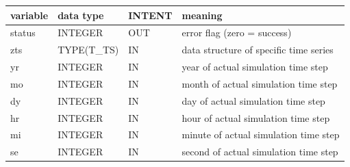 \documentclass[11pt,twoside]{report}
\begin{document}
\begin{tabular}{lllp{6cm}}\hline
 variable & data type &  INTENT & meaning\\\hline
 status &   INTEGER   &  OUT    & error flag (zero = success)\\
 zts    &   TYPE(T\_TS) & IN    & data structure of specific time series\\
 yr     &   INTEGER     & IN    & year of actual simulation time step\\
 mo     &   INTEGER     & IN    & month of actual simulation time step\\
 dy     &   INTEGER     & IN    & day of actual simulation time step\\
 hr     &   INTEGER     & IN    & hour of actual simulation time step\\
 mi     &   INTEGER     & IN    & minute of actual simulation time step\\
 se     &   INTEGER     & IN    & second of actual simulation time step\\\hline
\end{tabular}
\end{document}

